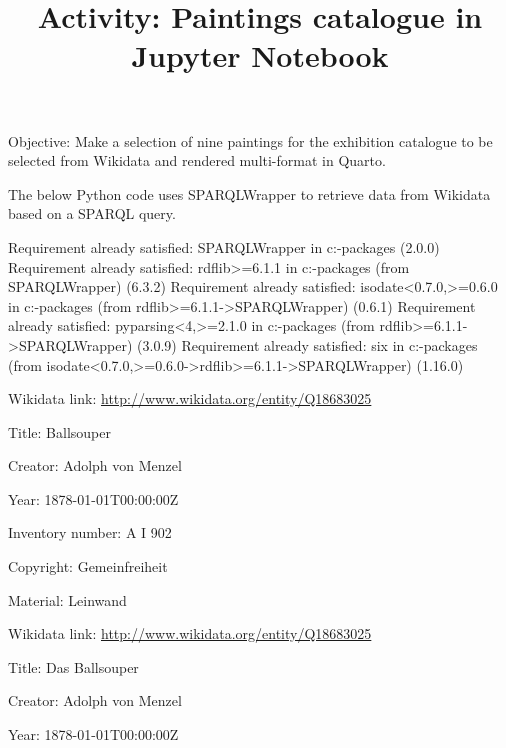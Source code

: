 \documentclass[
  letterpaper,
  DIV=11,
  numbers=noendperiod]{scrartcl}
\title{Activity: Paintings catalogue in Jupyter Notebook}
\author{}
\date{}
\begin{document}
\maketitle
\ifdefined\Shaded\renewenvironment{Shaded}{\begin{tcolorbox}[enhanced, interior hidden, sharp corners, frame hidden, boxrule=0pt, breakable, borderline west={3pt}{0pt}{shadecolor}]}{\end{tcolorbox}}\fi

Objective: Make a selection of nine paintings for the exhibition
catalogue to be selected from Wikidata and rendered multi-format in
Quarto.

The below Python code uses SPARQLWrapper to retrieve data from Wikidata
based on a SPARQL query.

Requirement already satisfied: SPARQLWrapper in
c:\users\lisas\appdata\local\programs\python{}\lib\site-packages
(2.0.0) Requirement already satisfied: rdflib\textgreater=6.1.1 in
c:\users\lisas\appdata\local\programs\python{}\lib\site-packages
(from SPARQLWrapper) (6.3.2) Requirement already satisfied:
isodate\textless0.7.0,\textgreater=0.6.0 in
c:\users\lisas\appdata\local\programs\python{}\lib\site-packages
(from rdflib\textgreater=6.1.1-\textgreater SPARQLWrapper) (0.6.1)
Requirement already satisfied: pyparsing\textless4,\textgreater=2.1.0 in
c:\users\lisas\appdata\local\programs\python{}\lib\site-packages
(from rdflib\textgreater=6.1.1-\textgreater SPARQLWrapper) (3.0.9)
Requirement already satisfied: six in
c:\users\lisas\appdata\local\programs\python{}\lib\site-packages
(from
isodate\textless0.7.0,\textgreater=0.6.0-\textgreater rdflib\textgreater=6.1.1-\textgreater SPARQLWrapper)
(1.16.0)

Wikidata link: \url{http://www.wikidata.org/entity/Q18683025}

Title: Ballsouper

Creator: Adolph von Menzel

Year: 1878-01-01T00:00:00Z

Inventory number: A I 902

Copyright: Gemeinfreiheit

Material: Leinwand

Wikidata link: \url{http://www.wikidata.org/entity/Q18683025}

Title: Das Ballsouper

Creator: Adolph von Menzel

Year: 1878-01-01T00:00:00Z
\end{document}
